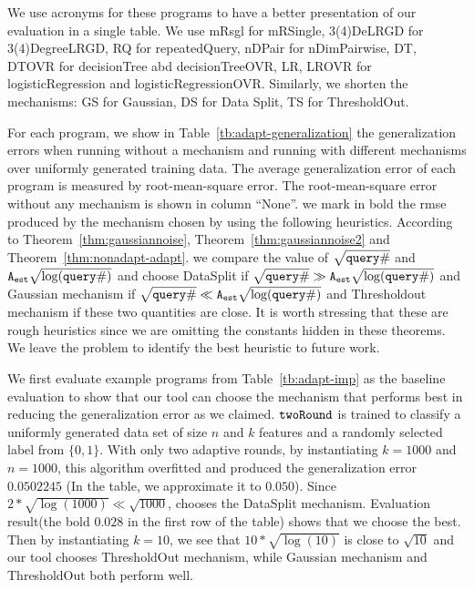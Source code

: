 {We use acronyms for these programs to have a better presentation of our evaluation in a single table. We use
mRsgl for mRSingle, 3(4)DeLRGD for 3(4)DegreeLRGD, RQ for repeatedQuery, nDPair for nDimPairwise,
DT, DTOVR for decisionTree abd decisionTreeOVR, LR, LROVR for logisticRegression and logisticRegressionOVR. Similarly, we shorten the mechanisms: GS for Gaussian, DS for Data Split,
TS for ThresholdOut.  }

For each program, we show in Table~\ref{tb:adapt-generalization} the
generalization errors when running without a mechanism and running
with different mechanisms over uniformly generated training data.  The
average generalization error of each program is measured by
root-mean-square error.  The root-mean-square error without any
mechanism is shown in column ``None''.  we mark in bold the rmse
produced by the mechanism chosen by {\THESYSTEM} using the following
heuristics.  According to Theorem~\ref{thm:gaussiannoise},
Theorem~\ref{thm:gaussiannoise2} and Theorem~\ref{thm:nonadapt-adapt}.
we compare the value of $\sqrt{{\tt query} \#}$ and
${\mathtt{A_{est}}}\sqrt{\log({\tt query} \#)}$ and choose DataSplit if
$\sqrt{{\tt query} \#} \gg {\ensuremath{\mathtt{A_{est}}}}\sqrt{\log({\tt query} \#)}$ and Gaussian
mechanism if $\sqrt{{\tt query} \#} \ll {\ensuremath{\mathtt{A_{est}}}}\sqrt{\log({\tt query} \#)}$ and
Thresholdout mechanism if these two quantities are close.  It is worth
stressing that these are rough heuristics since we are omitting the
constants hidden in these theorems. We leave the problem to identify
the best heuristic to future work.




We first evaluate example programs from Table~\ref{tb:adapt-imp} as the baseline evaluation to show that our tool can choose the mechanism that performs best in reducing the generalization error as we claimed.
$\mathtt{twoRound}$ is trained to classify a uniformly generated data set of size $n$ and $k$ features and a randomly selected label from $\{0, 1\}$. 
With only two adaptive rounds, by instantiating $k = 1000$ and $n = 1000$, this algorithm overfitted and produced the generalization error 
$0.0502245$ (In the table, we approximate it to $0.050$).
Since $2* \sqrt{\log(1000)} \ll \sqrt{1000}$, {\THESYSTEM} chooses the DataSplit mechanism.
Evaluation result(the bold $0.028$ in the first row of the table) shows that we choose the best.
Then by instantiating $k = 10$, we see that $10 * \sqrt{\log(10)}$ is close to $\sqrt{10}$ and our tool chooses ThresholdOut mechanism, while Gaussian mechanism and ThresholdOut both perform well.

